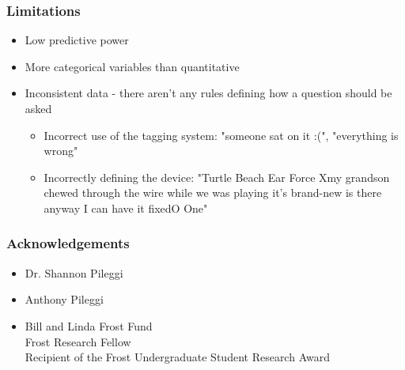 \documentclass{beamer}
\begin{document}

\begin{frame}
\frametitle{Limitations}

  \begin{itemize}
      \item Low predictive power 
      \item More categorical variables than quantitative 
      \item Inconsistent data - there aren't any rules defining how a question should be asked
      \smallskip
      \begin{itemize}
          \item Incorrect use of the tagging system: "someone sat on it :(", "everything is wrong"
          \item Incorrectly defining the device: "Turtle Beach Ear Force Xmy grandson chewed through the wire while we was playing it's brand-new is there anyway I can have it fixedO One"
      \end{itemize}
  \end{itemize}

\end{frame}

\begin{frame}
\frametitle{Acknowledgements}
  \begin{itemize}
    \item Dr. Shannon Pileggi
    \item Anthony Pileggi
    \item Bill and Linda Frost Fund\\
          Frost Research Fellow\\
          Recipient of the Frost Undergraduate Student Research Award
  \end{itemize}
\end{frame}

 
\end{document}
